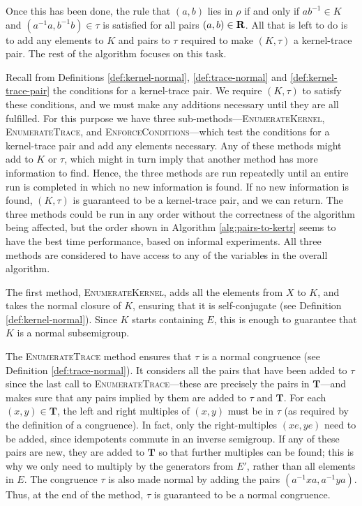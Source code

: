 Once this has been done, the rule that $(a,b)$ lies in $\rho$ if and only if
$ab^{-1} \in K$ and $(a^{-1}a, b^{-1}b) \in \tau$ is satisfied for all pairs
$(a,b) \in \mathbf{R}$.  All that is left to do is to add any elements to $K$
and pairs to $\tau$ required to make $(K, \tau)$ a kernel-trace pair.  The rest
of the algorithm focuses on this task.

Recall from Definitions \ref{def:kernel-normal}, \ref{def:trace-normal} and
\ref{def:kernel-trace-pair} the conditions for a kernel-trace pair.  We require
$(K, \tau)$ to satisfy these conditions, and we must make any additions
necessary until they are all fulfilled.  For this purpose we have three
sub-methods---\textsc{EnumerateKernel}, \textsc{EnumerateTrace}, and
\textsc{EnforceConditions}---which test the conditions for a kernel-trace pair
and add any elements necessary.  Any of these methods might add to $K$ or
$\tau$, which might in turn imply that another method has more information to
find.  Hence, the three methods are run repeatedly until an entire run is
completed in which no new information is found.  If no new information is found,
$(K, \tau)$ is guaranteed to be a kernel-trace pair, and we can return.  The
three methods could be run in any order without the correctness of the algorithm
being affected, but the order shown in Algorithm \ref{alg:pairs-to-kertr} seems
to have the best time performance, based on informal experiments.  All three
methods are considered to have access to any of the variables in the overall
algorithm.

The first method, \textsc{EnumerateKernel}, adds all the elements from $X$ to
$K$, and takes the normal closure of $K$, ensuring that it is self-conjugate
(see Definition \ref{def:kernel-normal}).  Since $K$ starts containing $E$, this
is enough to guarantee that $K$ is a normal subsemigroup.

The \textsc{EnumerateTrace} method ensures that $\tau$ is a normal congruence
(see Definition \ref{def:trace-normal}).  It considers all the pairs that have
been added to $\tau$ since the last call to \textsc{EnumerateTrace}---these are
precisely the pairs in $\mathbf{T}$---and makes sure that any pairs implied by
them are added to $\tau$ and $\mathbf{T}$.  For each $(x,y) \in \mathbf{T}$, the
left and right multiples of $(x,y)$ must be in $\tau$ (as required by the
definition of a congruence).  In fact, only the right-multiples $(xe, ye)$ need
to be added, since idempotents commute in an inverse semigroup.  If any of these
pairs are new, they are added to $\mathbf{T}$ so that further multiples can be
found; this is why we only need to multiply by the generators from $E'$, rather
than all elements in $E$.  The congruence $\tau$ is also made normal by adding
the pairs $(a^{-1}xa, a^{-1}ya)$.  Thus, at the end of the method, $\tau$ is
guaranteed to be a normal congruence.

